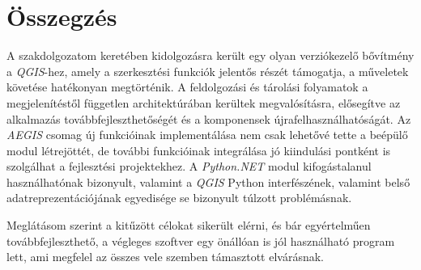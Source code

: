 \chapter{Összegzés}
\label{ch:sum}
A szakdolgozatom keretében kidolgozásra került egy olyan verziókezelő bővítmény a \emph{QGIS}-hez, amely a szerkesztési funkciók jelentős részét támogatja, a műveletek követése hatékonyan megtörténik. A feldolgozási és tárolási folyamatok a megjelenítéstől független architektúrában kerültek megvalósításra, elősegítve az alkalmazás továbbfejleszthetőségét és a komponensek újrafelhasználhatóságát. Az \emph{AEGIS} csomag új funkcióinak implementálása nem csak lehetővé tette a beépülő modul létrejöttét, de további funkcióinak integrálása jó kiindulási pontként is szolgálhat a fejlesztési projektekhez. A \emph{Python.NET} modul kifogástalanul használhatónak bizonyult, valamint a \emph{QGIS} Python interfészének, valamint belső adatreprezentációjának egyedisége se bizonyult túlzott problémásnak.

Meglátásom szerint a kitűzött célokat sikerült elérni, és bár egyértelműen továbbfejleszthető, a végleges szoftver egy önállóan is jól használható program lett, ami megfelel az összes vele szemben támasztott elvárásnak.